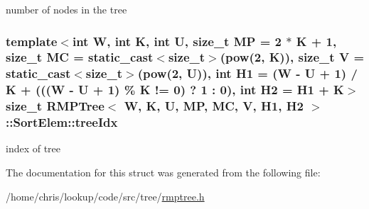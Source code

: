 number of nodes in the tree 

\hypertarget{structRMPTree_1_1SortElem_aa5217368661cb5c31474587ab41a71cd}{
\subsubsection[{tree\-Idx}]{\setlength{\rightskip}{0pt plus 5cm}template$<$int W, int K, int U, size\-\_\-t M\-P = 2 $\ast$ K + 1, size\-\_\-t M\-C = static\-\_\-cast$<$size\-\_\-t$>$(pow(2, K)), size\-\_\-t V = static\-\_\-cast$<$size\-\_\-t$>$(pow(2, U)), int H1 = (\-W -\/ U + 1) / K + (((\-W -\/ U + 1) \% K != 0) ? 1 \-: 0), int H2 = H1 + K$>$ size\-\_\-t {\bf R\-M\-P\-Tree}$<$ {\bf W}, K, U, M\-P, M\-C, V, H1, H2 $>$\-::Sort\-Elem\-::tree\-Idx}}\label{structRMPTree_1_1SortElem_aa5217368661cb5c31474587ab41a71cd}


index of tree 



The documentation for this struct was generated from the following file\-:\begin{DoxyCompactItemize}
\item 
/home/chris/lookup/code/src/tree/\hyperlink{rmptree_8h}{rmptree.\-h}\end{DoxyCompactItemize}
